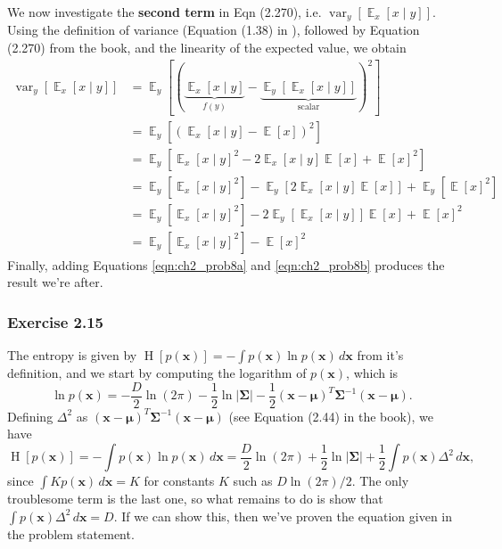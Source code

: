 \documentclass[12pt, a4paper]{article}
\newcommand{\vect}[1]{\bm{#1}}
\newcommand{\abs}[1]{\left\lvert#1\right\rvert}
\DeclareMathOperator{\E}{\mathbb{E}}
\DeclareMathOperator{\var}{\operatorname{var}}
\renewcommand{\H}{\operatorname{H}}
\begin{document}
We now investigate the \textbf{second term} in Eqn (2.270), i.e. 
$\var_y \left[ \E_x \left[ x \mid y \right] \right]$.
Using the definition of variance (Equation (1.38) in \cite{bishop_pattern_2011}), followed by Equation (2.270) from the book, and the linearity of the expected value, we obtain
\begin{align}
\nonumber \var_y \left[ \E_x \left[ x \mid y \right] \right]
&= \E_y \left[ 
\left( \underbrace{\E_x \left[ x \mid y \right]}_{f(y)} - 
\underbrace{\E_y \left[ \E_x \left[ x \mid y \right] \right]}_{\text{scalar}} 
\right)^2 \right]   \\
\nonumber &= \E_y \left[ 
\left( \E_x \left[ x \mid y \right] - 
\E[x]
\right)^2 \right] \tag{previous result} \\
\nonumber &= \E_y \left[ 
\E_x \left[ x \mid y \right]^2
-2 \E_x \left[ x \mid y \right] \E[x]
+\E[x]^2
\right] \tag{multiply} \\
\nonumber &= \E_y \left[ 
\E_x \left[ x \mid y \right]^2 \right]
-\E_y \left[ 2 \E_x \left[ x \mid y \right] \E[x] \right]
+\E_y \left[ \E[x]^2
\right] \tag{linearity} \\
 \nonumber &= \E_y \left[ 
\E_x \left[ x \mid y \right]^2 \right]
- 2 \E_y \left[ \E_x \left[ x \mid y \right] \right] \E[x] 
+ \E[x]^2
 \tag{constants}\\
\label{eqn:ch2_prob8b} &= \E_y \left[ 
 \E_x \left[ x \mid y \right]^2 \right]
 - \E[x]^2
\end{align}
Finally, adding Equations \eqref{eqn:ch2_prob8a} and \eqref{eqn:ch2_prob8b} produces the result we're after.


\subsubsection*{Exercise 2.15}
The entropy is given by $\H[p(\vect{x})] = - \int p(\vect{x}) \ln p(\vect{x}) \, d\vect{x}$ from it's definition, and we start by computing the logarithm of $p(\vect{x})$, which is
\begin{equation*}
	\ln p(\vect{x}) = -\frac{D}{2} \ln (2 \pi ) - \frac{1}{2} \ln \abs{\vect{\Sigma}} - \frac{1}{2} (\vect{x} - \vect{\mu})^T \vect{\Sigma}^{-1}(\vect{x} - \vect{\mu}).
\end{equation*}
Defining $\Delta^2$ as $(\vect{x} - \vect{\mu})^T \vect{\Sigma}^{-1}(\vect{x} - \vect{\mu})$ (see Equation (2.44) in the book), we have
\begin{equation*}
	\H[p(\vect{x})] = - \int p(\vect{x}) \ln p(\vect{x}) \, d\vect{x} = 
	\frac{D}{2} \ln (2 \pi ) + \frac{1}{2} \ln \abs{\vect{\Sigma}}
	+ \frac{1}{2}\int   p(\vect{x}) \Delta^2 \, d\vect{x},
\end{equation*}
since $\int K p(\vect{x}) \, d\vect{x} = K$ for constants $K$ such as $D \ln (2\pi) /2$.
The only troublesome term is the last one, so what remains to do is show that $\int p(\vect{x}) \Delta^2 \, d\vect{x} = D$.
If we can show this, then we've proven the equation given in the problem statement.
\end{document}
